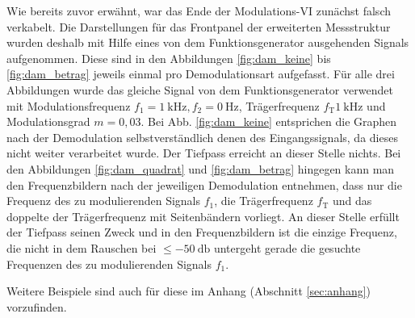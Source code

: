 Wie bereits zuvor erwähnt, war das Ende der Modulations-VI zunächst falsch verkabelt.
Die Darstellungen für das Frontpanel der erweiterten Messstruktur wurden deshalb mit Hilfe eines von dem Funktionsgenerator ausgehenden Signals aufgenommen.
Diese sind in den Abbildungen \ref{fig:dam_keine} bis \ref{fig:dam_betrag} jeweils einmal pro Demodulationsart aufgefasst.
Für alle drei Abbildungen wurde das gleiche Signal von dem Funktionsgenerator verwendet mit Modulationsfrequenz $f_1= \SI{1}{\kilo\hertz}, f_2 = \SI{0}{\hertz}$, Trägerfrequenz $f_\text{T}\SI{1}{\kilo\hertz}$ und Modulationsgrad $m = 0,03$.
Bei Abb. \ref{fig:dam_keine} entsprichen die Graphen nach der Demodulation selbstverständlich denen des Eingangssignals, da dieses nicht weiter verarbeitet wurde.
Der Tiefpass erreicht an dieser Stelle nichts.
Bei den Abbildungen \ref{fig:dam_quadrat} und \ref{fig:dam_betrag} hingegen kann man den Frequenzbildern nach der jeweiligen Demodulation entnehmen, dass nur die Frequenz des zu modulierenden Signals $f_1$, die Trägerfrequenz $f_\text{T}$ und das doppelte der Trägerfrequenz mit Seitenbändern vorliegt.
An dieser Stelle erfüllt der Tiefpass seinen Zweck und in den Frequenzbildern ist die einzige Frequenz, die nicht in dem Rauschen bei $\leq \SI{-50}{\decibel}$ untergeht gerade die gesuchte Frequenzen des zu modulierenden Signals $f_1$.

Weitere Beispiele sind auch für diese im Anhang (Abschnitt \ref{sec:anhang}) vorzufinden.

